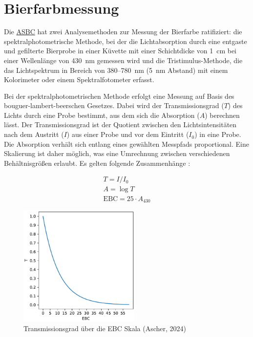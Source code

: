 \documentclass[10pt,a4paper,DIV=12,parskip=half]{scrarticle}
\begin{document}
\section*{Bierfarbmessung}

Die \href{https://www.asbcnet.org}{ASBC} hat zwei Analysemethoden zur Messung der Bierfarbe ratifiziert: die spektralphotometrische Methode, bei der die Lichtabsorption durch eine entgaste und gefilterte Bierprobe in einer Küvette mit einer Schichtdicke von 1~cm bei einer Wellenlänge von 430~nm gemessen wird und die Tristimulus-Methode, die das Lichtspektrum in Bereich von 380--780~nm (5~nm Abstand) mit einem Kolorimeter oder einem Spektralfotometer erfasst. \parencite{ASBC2011}

Bei der spektralphotometrischen Methode erfolgt eine Messung auf Basis des bouguer-lambert-beerschen Gesetzes. Dabei wird der Transmissionsgrad ($T$) des Lichts durch eine Probe bestimmt, aus dem sich die Absorption ($A$) berechnen lässt. Der Transmissionsgrad ist der Quotient zwischen den Lichtsintensitäten nach dem Austritt ($I$) aus einer Probe und vor dem Eintritt ($I_0$) in eine Probe. Die Absorption verhält sich entlang eines gewählten Messpfads proportional. Eine Skalierung ist daher möglich, was eine Umrechnung zwischen verschiedenen Behältnisgrößen erlaubt. Es gelten folgende Zusammenhänge \parencite{deLange2016}:

\begin{equation*}
	\begin{gathered}
		T =  I / I_0 \\
		A = \log T \\		
		\textrm{EBC} = 25 \cdot A_{430}
	\end{gathered}
\end{equation*}

\begin{figure}[H]
	\centering
	\includegraphics[width=6cm]{transmission.pdf}
	\caption{Transmissionsgrad über die EBC Skala (Ascher, 2024)}
	\label{fig:transmission}
\end{figure}
\end{document}
